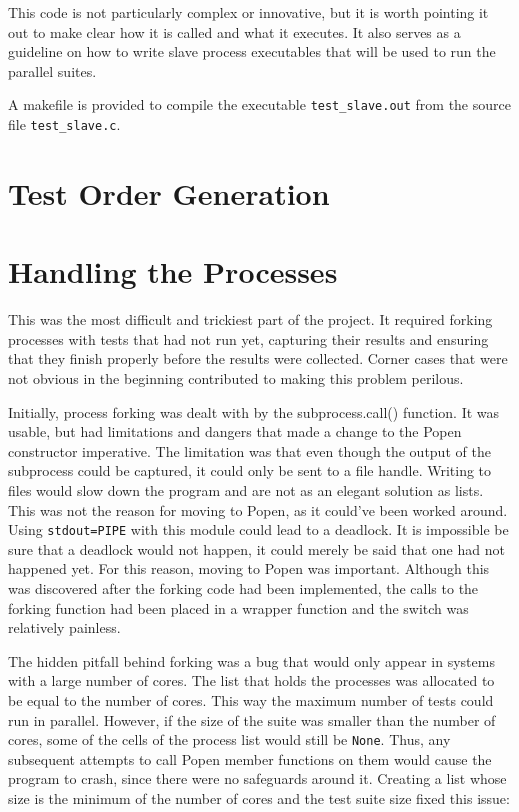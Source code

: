 This code is not particularly complex or innovative, but it is worth pointing it out to make clear how it is called and what it executes. It also serves as a guideline on how to write slave process executables that will be used to run the parallel suites.

A makefile is provided to compile the executable \texttt{test\_slave.out} from the source file \texttt{test\_slave.c}.

\section{Test Order Generation}

\section{Handling the Processes}
This was the most difficult and trickiest part of the project. It required forking processes with tests that had not run yet, capturing their results and ensuring that they finish properly before the results were collected. Corner cases that were not obvious in the beginning contributed to making this problem perilous. 

Initially, process forking was dealt with by the subprocess.call() function. It was usable, but had limitations and dangers that made a change to the Popen constructor imperative. The limitation was that even though the output of the subprocess could be captured, it could only be sent to a file handle. Writing to files would slow down the program and are not as an elegant solution as lists. This was not the reason for moving to Popen, as it could've been worked around. Using \texttt{stdout=PIPE} with this module could lead to a deadlock. It is impossible be sure that a deadlock would not happen, it could merely be said that one had not happened yet. For this reason, moving to Popen was important. Although this was discovered after the forking code had been implemented, the calls to the forking function had been placed in a wrapper function and the switch was relatively painless.

The hidden pitfall behind forking was a bug that would only appear in systems with a large number of cores. The list that holds the processes was allocated to be equal to the number of cores. This way the maximum number of tests could run in parallel. However, if the size of the suite was smaller than the number of cores, some of the cells of the process list would still be \texttt{None}. Thus, any subsequent attempts to call Popen member functions on them would cause the program to crash, since there were no safeguards around it. Creating a list whose size is the minimum of the number of cores and the test suite size fixed this issue:

